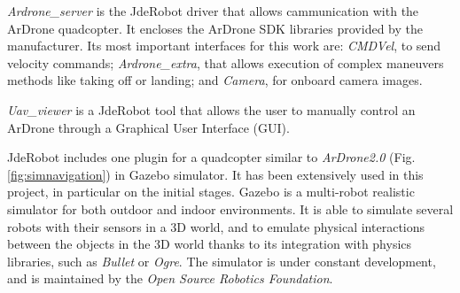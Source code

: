 \documentclass{styles/svproc}
\begin{document}
	\textit{Ardrone\_server} is the JdeRobot driver that allows cammunication with the ArDrone quadcopter. It encloses the ArDrone SDK libraries provided by the manufacturer. 
Its most important interfaces for this work are: \textit{CMDVel}, to send velocity commands; \textit{Ardrone\_extra}, that allows execution of complex maneuvers methods like taking off or landing; and \textit{Camera}, for onboard camera images.

	\textit{Uav\_viewer} is a JdeRobot tool that allows the user to manually control an ArDrone through a Graphical User Interface (GUI).

        JdeRobot includes one plugin for a quadcopter similar to \textit{ArDrone2.0} (Fig. \ref{fig:simnavigation}) in Gazebo simulator. It has been extensively used in this project, in particular on the initial stages. Gazebo is a multi-robot realistic simulator for both outdoor and indoor environments. It is able to simulate several robots with their sensors in a 3D world, and  
to emulate physical interactions between the objects in the 3D world thanks to its integration with physics libraries, such as \textit{Bullet} or \textit{Ogre}. The simulator is under constant development, and is maintained by the \textit{Open Source Robotics Foundation}. 
\end{document}
